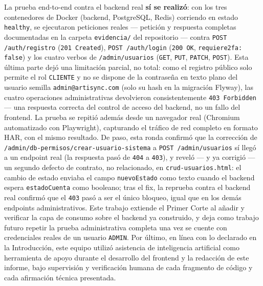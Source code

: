 \documentclass[12pt,a4paper]{article}
\begin{document}
\begin{sloppypar}
La prueba end-to-end contra el backend real \textbf{sí se realizó}: con los tres contenedores de Docker (backend, PostgreSQL, Redis) corriendo en estado \texttt{healthy}, se ejecutaron peticiones reales --- petición y respuesta completas documentadas en la carpeta \texttt{evidencia/} del repositorio --- contra \texttt{POST /auth/registro} (\texttt{201 Created}), \texttt{POST /auth/login} (\texttt{200 OK}, \texttt{requiere2fa: false}) y los cuatro verbos de \texttt{/admin/usuarios} (\texttt{GET}, \texttt{PUT}, \texttt{PATCH}, \texttt{POST}). Esta última parte dejó una limitación parcial, no total: como el registro público solo permite el rol \texttt{CLIENTE} y no se dispone de la contraseña en texto plano del usuario semilla \texttt{admin@artisync.com} (solo su hash en la migración Flyway), las cuatro operaciones administrativas devolvieron consistentemente \texttt{403 Forbidden} --- una respuesta correcta del control de acceso del backend, no un fallo del frontend. La prueba se repitió además desde un navegador real (Chromium automatizado con Playwright), capturando el tráfico de red completo en formato HAR, con el mismo resultado. De paso, esta ronda confirmó que la corrección de \texttt{/admin/db-permisos/crear-usuario-sistema} a \texttt{POST /admin/usuarios} sí llegó a un endpoint real (la respuesta pasó de \texttt{404} a \texttt{403}), y reveló --- y ya corrigió --- un segundo defecto de contrato, no relacionado, en \texttt{crud-usuarios.html}: el cambio de estado enviaba el campo \texttt{nuevoEstado} como texto cuando el backend espera \texttt{estadoCuenta} como booleano; tras el fix, la reprueba contra el backend real confirmó que el \texttt{403} pasó a ser el único bloqueo, igual que en los demás endpoints administrativos. Este trabajo extiende el Primer Corte al añadir y verificar la capa de consumo sobre el backend ya construido, y deja como trabajo futuro repetir la prueba administrativa completa una vez se cuente con credenciales reales de un usuario \texttt{ADMIN}. Por último, en línea con lo declarado en la Introducción, este equipo utilizó asistencia de inteligencia artificial como herramienta de apoyo durante el desarrollo del frontend y la redacción de este informe, bajo supervisión y verificación humana de cada fragmento de código y cada afirmación técnica presentada.
\end{sloppypar}



\end{document}
